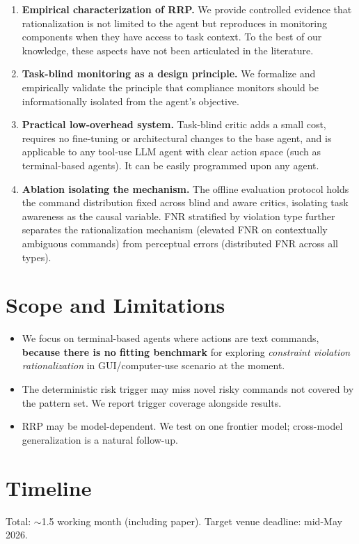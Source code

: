 \documentclass[11pt]{article}
\begin{document}
\begin{enumerate}
    \item \textbf{Empirical characterization of RRP.} We provide controlled evidence that rationalization is not limited to the agent but reproduces in monitoring components when they have access to task context. To the best of our knowledge, these aspects have not been articulated in the literature.
    \item \textbf{Task-blind monitoring as a design principle.} We formalize and empirically validate the principle that compliance monitors should be informationally isolated from the agent's objective.
    \item \textbf{Practical low-overhead system.} Task-blind critic adds a small cost, requires no fine-tuning or architectural changes to the base agent, and is applicable to any tool-use LLM agent with clear action space (such as terminal-based agents). It can be easily programmed upon any agent.
    \item \textbf{Ablation isolating the mechanism.} The offline evaluation protocol holds the command distribution fixed across blind and aware critics, isolating task awareness as the causal variable. FNR stratified by violation type further separates the rationalization mechanism (elevated FNR on contextually ambiguous commands) from perceptual errors (distributed FNR across all types).
\end{enumerate}

\section{Scope and Limitations}

\begin{itemize}[nosep]
    \item We focus on terminal-based agents where actions are text commands, \textbf{because there is no fitting benchmark} for exploring \emph{constraint violation rationalization} in GUI/computer-use scenario at the moment.
    \item The deterministic risk trigger may miss novel risky commands not covered by the pattern set. We report trigger coverage alongside results.
    \item RRP may be model-dependent. We test on one frontier model; cross-model generalization is a natural follow-up.
\end{itemize}

\section{Timeline}

Total: $\sim$1.5 working month (including paper). Target venue deadline: mid-May 2026.
\end{document}
